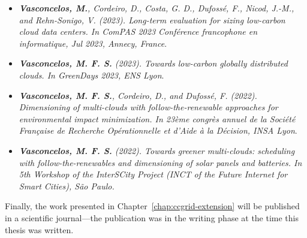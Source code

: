 \begin{itemize}

\item \textit{\textbf{Vasconcelos, M.}, Cordeiro, D., Costa, G. D., Dufossé, F., Nicod, J.-M., and Rehn-Sonigo, V. (2023). Long-term evaluation for sizing low-carbon cloud data centers. In ComPAS 2023 Conférence francophone en informatique, Jul 2023, Annecy, France}.

  \item  \textit{\textbf{Vasconcelos, M. F. S.} (2023). Towards low-carbon globally distributed clouds. In GreenDays 2023, ENS Lyon}.

\item  \textit{\textbf{Vasconcelos, M. F. S.}, Cordeiro, D., and Dufossé, F. (2022). Dimensioning of multi-clouds with follow-the-renewable approaches for environmental impact minimization. In 23ème congrès annuel de la Société Française de Recherche Opérationnelle et d’Aide à la Décision, INSA Lyon}.

\item  \textit{\textbf{Vasconcelos, M. F. S.} (2022). Towards greener multi-clouds: scheduling with follow-the-renewables and dimensioning of solar panels and batteries. In 5th Workshop of the InterSCity Project (INCT of the Future Internet for Smart Cities), São Paulo.}

\end{itemize}

Finally, the work presented in Chapter~\ref{chap:ccgrid-extension} will be published in a scientific journal---the publication was in the writing phase at the time this thesis was written.